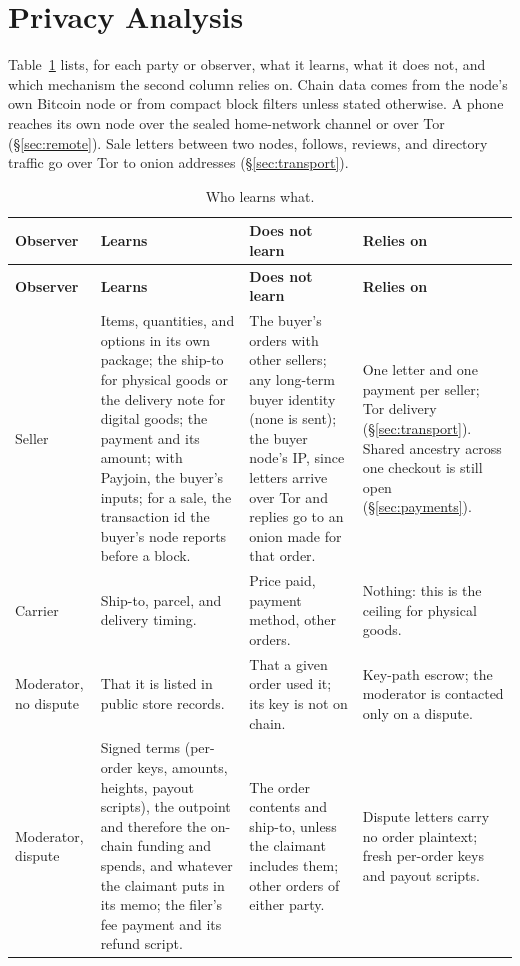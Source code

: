 \section{Privacy Analysis}
\label{sec:privacy}

Table~\ref{tab:learns} lists, for each party or observer, what it learns, what it does not, and which mechanism the second column relies on. Chain data comes from the node's own Bitcoin node or from compact block filters unless stated otherwise. A phone reaches its own node over the sealed home-network channel or over Tor (\S\ref{sec:remote}). Sale letters between two nodes, follows, reviews, and directory traffic go over Tor to onion addresses (\S\ref{sec:transport}).

{\small
\setlength{\tabcolsep}{4pt}
\renewcommand{\arraystretch}{1.15}
\begin{longtable}{@{}p{}p{}p{}p{}@{}}
\caption{Who learns what.}\label{tab:learns}\\
\toprule
\textbf{Observer} & \textbf{Learns} & \textbf{Does not learn} & \textbf{Relies on} \\
\midrule
\endfirsthead
\toprule
\textbf{Observer} & \textbf{Learns} & \textbf{Does not learn} & \textbf{Relies on} \\
\midrule
\endhead
\bottomrule
\endfoot
Seller & Items, quantities, and options in its own package; the ship-to for physical goods or the delivery note for digital goods; the payment and its amount; with Payjoin, the buyer's inputs; for a sale, the transaction id the buyer's node reports before a block. & The buyer's orders with other sellers; any long-term buyer identity (none is sent); the buyer node's IP, since letters arrive over Tor and replies go to an onion made for that order. & One letter and one payment per seller; Tor delivery (\S\ref{sec:transport}). Shared ancestry across one checkout is still open (\S\ref{sec:payments}). \\
Carrier & Ship-to, parcel, and delivery timing. & Price paid, payment method, other orders. & Nothing: this is the ceiling for physical goods. \\
Moderator, no dispute & That it is listed in public store records. & That a given order used it; its key is not on chain. & Key-path escrow; the moderator is contacted only on a dispute. \\
Moderator, dispute & Signed terms (per-order keys, amounts, heights, payout scripts), the outpoint and therefore the on-chain funding and spends, and whatever the claimant puts in its memo; the filer's fee payment and its refund script. & The order contents and ship-to, unless the claimant includes them; other orders of either party. & Dispute letters carry no order plaintext; fresh per-order keys and payout scripts. \\

\end{longtable}}
